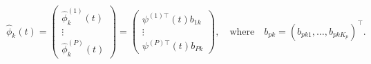 \begin{equation}
    \widehat{\phi}_k(t) = 
        \begin{pmatrix} 
            \widehat{\phi}_k^{(1)}(t) \\
            \vdots \\
            \widehat{\phi}_k^{(P)}(t)
        \end{pmatrix} = 
        \begin{pmatrix} 
            \psi^{(1) \top}(t) b_{1k} \\
            \vdots \\
            \psi^{(P) \top}(t) b_{Pk}
        \end{pmatrix}, \quad\text{where}\quad
        b_{pk} = \left(b_{p k 1}, \dots, b_{p k K_p} \right)^\top.
\end{equation}

